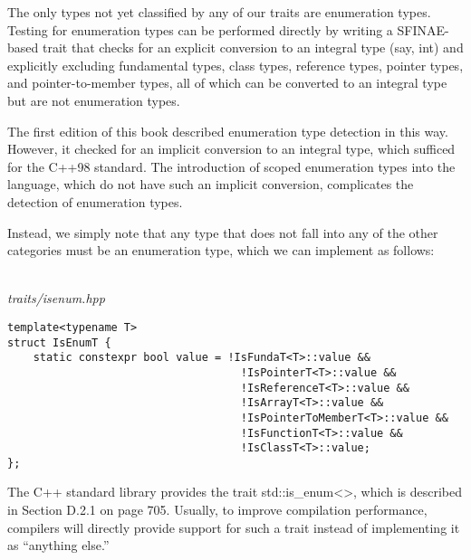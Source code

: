 
The only types not yet classified by any of our traits are enumeration types. Testing for enumeration types can be performed directly by writing a SFINAE-based trait that checks for an explicit conversion to an integral type (say, int) and explicitly excluding fundamental types, class types, reference types, pointer types, and pointer-to-member types, all of which can be converted to an integral type but are not enumeration types.

\begin{tcolorbox}[colback=webgreen!5!white,colframe=webgreen!75!black]
\hspace*{0.75cm}The first edition of this book described enumeration type detection in this way. However, it checked for an implicit conversion to an integral type, which sufficed for the C++98 standard. The introduction of scoped enumeration types into the language, which do not have such an implicit conversion, complicates the detection of enumeration types.
\end{tcolorbox}

Instead, we simply note that any type that does not fall into any of the other categories must be an enumeration type, which we can implement as follows:

\hspace*{\fill} \\ %
\noindent
\textit{traits/isenum.hpp}
\begin{lstlisting}[style=styleCXX]
template<typename T>
struct IsEnumT {
	static constexpr bool value = !IsFundaT<T>::value &&
									!IsPointerT<T>::value &&
									!IsReferenceT<T>::value &&
									!IsArrayT<T>::value &&
									!IsPointerToMemberT<T>::value &&
									!IsFunctionT<T>::value &&
									!IsClassT<T>::value;
};
\end{lstlisting}

The C++ standard library provides the trait std::is\_enum<>, which is described in Section D.2.1 on page 705. Usually, to improve compilation performance, compilers will directly provide support for such a trait instead of implementing it as “anything else.”














